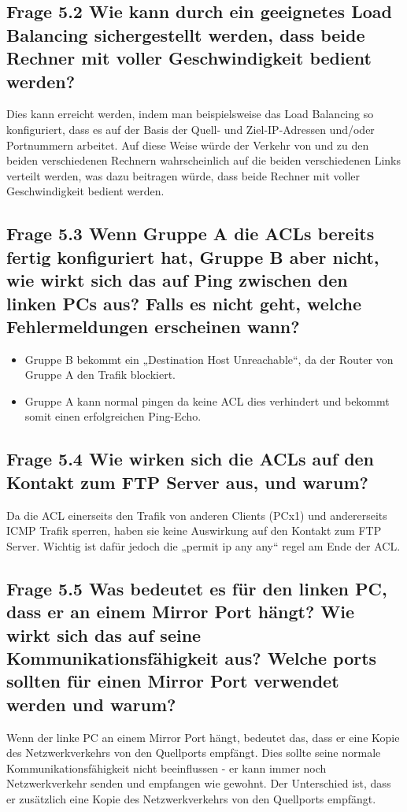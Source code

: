 \documentclass{article}
\begin{document}
\subsection*{Frage 5.2 \normalfont Wie kann durch ein geeignetes Load Balancing sichergestellt werden, dass beide Rechner mit voller Geschwindigkeit bedient werden?}
Dies kann erreicht werden, indem man beispielsweise das Load Balancing so konfiguriert, dass es auf der Basis der Quell- und Ziel-IP-Adressen und/oder Portnummern arbeitet. Auf diese Weise würde der Verkehr von und zu den beiden verschiedenen Rechnern wahrscheinlich auf die beiden verschiedenen Links verteilt werden, was dazu beitragen würde, dass beide Rechner mit voller Geschwindigkeit bedient werden.\\

\subsection*{Frage 5.3 \normalfont Wenn Gruppe A die ACLs bereits fertig konfiguriert hat, Gruppe B aber nicht, wie wirkt sich das auf Ping zwischen den linken PCs aus? Falls es nicht geht, welche Fehlermeldungen erscheinen wann?}

\begin{itemize}
  \item Gruppe B bekommt ein „Destination Host Unreachable“, da der Router von Gruppe A den Trafik blockiert.
  \item Gruppe A kann normal pingen da keine ACL dies verhindert und bekommt somit einen erfolgreichen Ping-Echo.
\end{itemize}
\subsection*{Frage 5.4 \normalfont Wie wirken sich die ACLs auf den Kontakt zum FTP Server aus, und warum?} 
Da die ACL einerseits den Trafik von anderen Clients (PCx1) und andererseits ICMP Trafik sperren, haben sie keine Auswirkung auf den Kontakt zum FTP Server. Wichtig ist dafür jedoch die „permit ip any any“ regel am Ende der ACL.\\

\pagebreak

\subsection*{Frage 5.5 \normalfont Was bedeutet es für den linken PC, dass er an einem Mirror Port hängt? Wie wirkt sich das auf seine Kommunikationsfähigkeit aus? Welche ports sollten für einen Mirror Port verwendet werden und warum?}
Wenn der linke PC an einem Mirror Port hängt, bedeutet das, dass er eine Kopie des Netzwerkverkehrs von den Quellports empfängt. Dies sollte seine normale Kommunikationsfähigkeit nicht beeinflussen - er kann immer noch Netzwerkverkehr senden und empfangen wie gewohnt. Der Unterschied ist, dass er zusätzlich eine Kopie des Netzwerkverkehrs von den Quellports empfängt.\\
\end{document}
